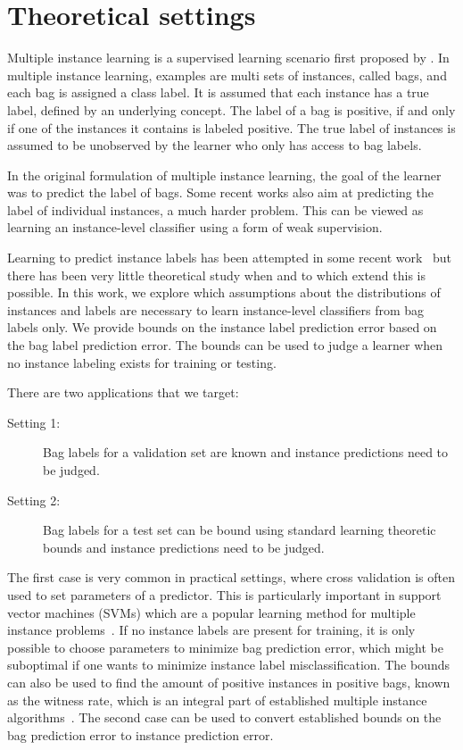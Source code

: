 \section{Theoretical settings}
Multiple instance learning is a supervised learning scenario first proposed by \citet{dietterich1997solving}.
In multiple instance learning, examples are multi sets of instances, called bags, and each bag is assigned a class label.
It is assumed that each instance has a true label, defined by an underlying concept. The label of a bag is positive, if and only if one of
the instances it contains is labeled positive. The true label of instances is assumed to be unobserved by the learner who only has access to bag labels.

In the original formulation of multiple instance learning, the goal of the learner
was to predict the label of bags. Some recent works also aim at predicting
the label of individual instances, a much harder problem.
This can be viewed as learning an instance-level classifier using a form of weak supervision.

Learning to predict instance labels has been attempted in some recent work~\citep{liconvex2010,zhang2002dd}
but there has been very little theoretical study when and to which extend this is possible.
In this work, we explore which assumptions about the distributions of instances and labels
are necessary to learn instance-level classifiers from bag labels only.
We provide bounds on the instance label prediction error based on the
bag label prediction error. The bounds can be used to judge a learner when no
instance labeling exists for training or testing.

There are two applications that we target:
\begin{description}
\item[Setting 1:] Bag labels for a validation set are known and instance predictions need to be judged.
\item[Setting 2:] Bag labels for a test set can be bound using standard learning theoretic bounds and instance
predictions need to be judged.
\end{description}
The first case is very common in practical settings, where
cross validation is often used to set parameters of a predictor. This is
particularly important in support vector machines (SVMs) which are a popular
learning method for multiple instance problems~\citep{andrews2003support}.
If no instance labels are present for training, it is only possible to
choose parameters to minimize bag prediction error, which might be suboptimal if one
wants to minimize instance label misclassification. 
The bounds can also be used to find the amount of positive instances in positive bags,
known as the witness rate, which is an integral part of established multiple
instance algorithms~\citep{zhang2002dd,liconvex2010}.
The second case can be used to convert established bounds on the bag prediction error
to instance prediction error.

